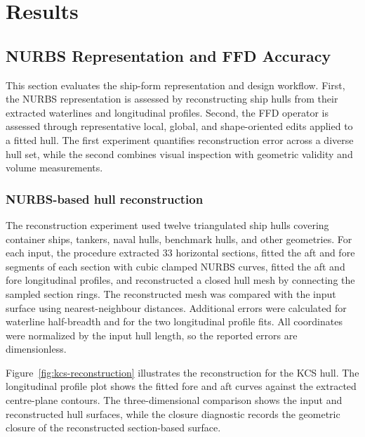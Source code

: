 \documentclass[a4paper,fleqn]{cas-dc}
\begin{document}
\section{Results}
\label{sec:results}

\subsection{NURBS Representation and FFD Accuracy}
\label{sec:nurbs-results}

This section evaluates the ship-form representation and design workflow. First,
the NURBS representation is assessed by reconstructing ship hulls from their
extracted waterlines and longitudinal profiles. Second, the FFD operator is
assessed through representative local, global, and shape-oriented edits applied
to a fitted hull. The first experiment quantifies reconstruction error across a
diverse hull set, while the second combines visual inspection with geometric
validity and volume measurements.

\subsubsection{NURBS-based hull reconstruction}
\label{sec:nurbs-reconstruction-results}

The reconstruction experiment used twelve triangulated ship hulls covering
container ships, tankers, naval hulls, benchmark hulls, and other geometries. For
each input, the procedure extracted 33 horizontal sections, fitted the aft and fore
segments of each section with cubic clamped NURBS curves, fitted the aft and fore
longitudinal profiles, and reconstructed a closed hull mesh by connecting the
sampled section rings. The reconstructed mesh was compared with the input surface
using nearest-neighbour distances. Additional errors were calculated for waterline
half-breadth and for the two longitudinal profile fits. All coordinates were
normalized by the input hull length, so the reported errors are dimensionless.

Figure~\ref{fig:kcs-reconstruction} illustrates the reconstruction for the KCS
hull. The longitudinal profile plot shows the fitted fore and aft curves against
the extracted centre-plane contours. The three-dimensional comparison shows the
input and reconstructed hull surfaces, while the closure diagnostic records the
geometric closure of the reconstructed section-based surface.
\end{document}
